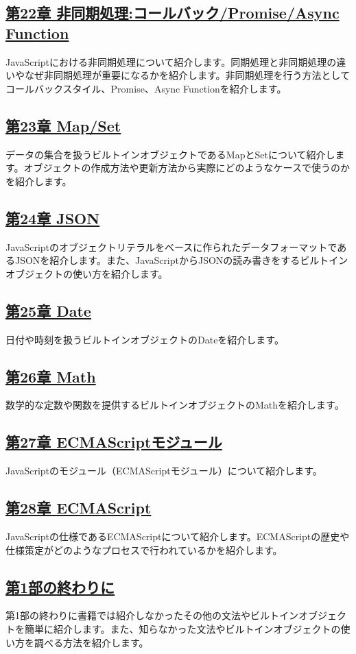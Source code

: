 \subsection*{\hyperlink{async-handling}{第22章 非同期処理:コールバック/Promise/Async
Function}}

JavaScriptにおける非同期処理について紹介します。同期処理と非同期処理の違いやなぜ非同期処理が重要になるかを紹介します。非同期処理を行う方法としてコールバックスタイル、Promise、Async
Functionを紹介します。

\subsection*{\hyperlink{map-and-set}{第23章 Map/Set}}

データの集合を扱うビルトインオブジェクトであるMapとSetについて紹介します。オブジェクトの作成方法や更新方法から実際にどのようなケースで使うのかを紹介します。

\subsection*{\hyperlink{json}{第24章 JSON}}

JavaScriptのオブジェクトリテラルをベースに作られたデータフォーマットであるJSONを紹介します。また、JavaScriptからJSONの読み書きをするビルトインオブジェクトの使い方を紹介します。

\subsection*{\hyperlink{date}{第25章 Date}}

日付や時刻を扱うビルトインオブジェクトのDateを紹介します。

\subsection*{\hyperlink{math}{第26章 Math}}

数学的な定数や関数を提供するビルトインオブジェクトのMathを紹介します。

\subsection*{\hyperlink{module}{第27章 ECMAScriptモジュール}}

JavaScriptのモジュール（ECMAScriptモジュール）について紹介します。

\subsection*{\hyperlink{ecmascript}{第28章 ECMAScript}}

JavaScriptの仕様であるECMAScriptについて紹介します。ECMAScriptの歴史や仕様策定がどのようなプロセスで行われているかを紹介します。

\subsection*{\hyperlink{end-of-basic-grammar}{第1部の終わりに}}

第1部の終わりに書籍では紹介しなかったその他の文法やビルトインオブジェクトを簡単に紹介します。また、知らなかった文法やビルトインオブジェクトの使い方を調べる方法を紹介します。
